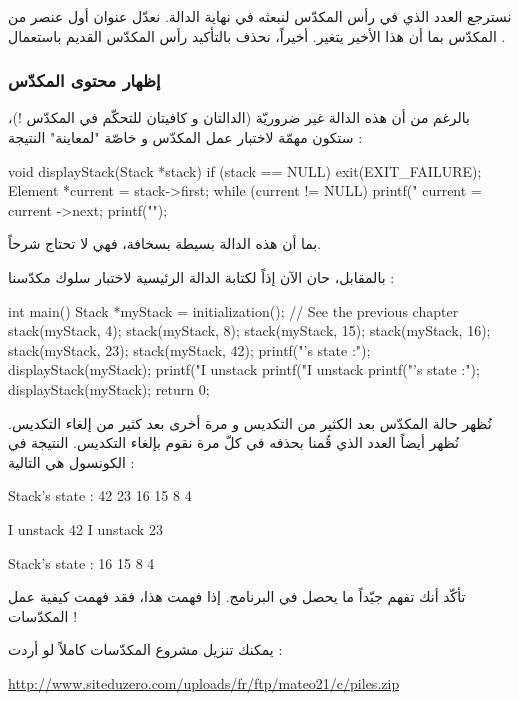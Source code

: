 نسترجع العدد الذي في رأس المكدّس لنبعثه في نهاية الدالة. نعدّل عنوان أول عنصر من المكدّس بما أن هذا الأخير يتغير.
أخيراً، نحذف بالتأكيد رأس المكدّس القديم باستعمال
.

\subsubsection{إظهار محتوى المكدّس}

بالرغم من أن هذه الدالة غير ضروريّة (الدالتان
و 
كافيتان للتحكّم في المكدّس !)، ستكون مهمّة لاختبار عمل المكدّس و خاصّة "لمعاينة" النتيجة :

\begin{Csource}
void displayStack(Stack *stack)
{
	if (stack == NULL)
	{
		exit(EXIT_FAILURE);
	}
	Element *current = stack->first;
	while (current != NULL)
	{
		printf("%
		current = current ->next;
	}
	printf("\n");
}
\end{Csource}

بما أن هذه الدالة بسيطة بسخافة، فهي لا تحتاج شرحاً.

بالمقابل، حان الآن إذاً لكتابة الدالة الرئيسية لاختبار سلوك مكدّسنا :

\begin{Csource}
int main()
{
	Stack *myStack = initialization(); // See the previous chapter
	stack(myStack, 4);
	stack(myStack, 8);
	stack(myStack, 15);
	stack(myStack, 16);
	stack(myStack, 23);
	stack(myStack, 42);
	printf("\nStack's state :\n");
	displayStack(myStack);
	printf("I unstack %
	printf("I unstack %
	printf("\nStack's state :\n");
	displayStack(myStack);
	return 0;
}
\end{Csource}

نُظهر حالة المكدّس بعد الكثير من التكديس و مرة أخرى بعد كثير من إلغاء التكديس. نُظهر أيضاً العدد الذي قُمنا بحذفه في كلّ مرة نقوم بإلغاء التكديس. النتيجة في الكونسول هي التالية :

\begin{Console}
Stack's state :
42
23
16
15
8
4

I unstack 42
I unstack 23

Stack's state :
16
15
8
4
\end{Console}

تأكّد أنك تفهم جيّداً ما يحصل في البرنامج. إذا فهمت هذا، فقد فهمت كيفية عمل المكدّسات !

يمكنك تنزيل مشروع المكدّسات كاملاً لو أردت :

\url{http://www.siteduzero.com/uploads/fr/ftp/mateo21/c/piles.zip}

